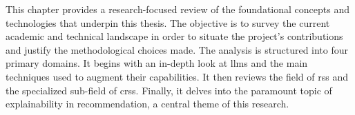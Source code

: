 This chapter provides a research-focused review of the foundational concepts and technologies that underpin this thesis. The objective is to survey the current academic and technical landscape in order to situate the project's contributions and justify the methodological choices made. The analysis is structured into four primary domains. It begins with an in-depth look at \aclp{llm} and the main techniques used to augment their capabilities. It then reviews the field of \aclp{rs} and the specialized sub-field of \aclp{crs}. Finally, it delves into the paramount topic of explainability in recommendation, a central theme of this research.